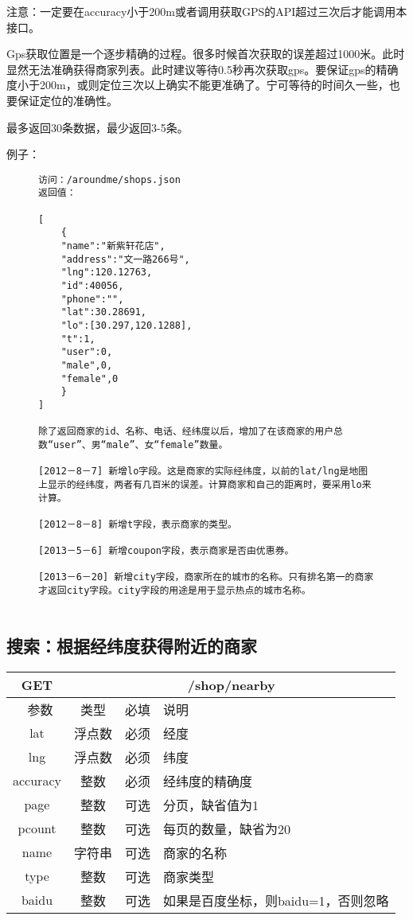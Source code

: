 \documentclass[cs4size]{ctexartutf8}
\begin{document}
注意：一定要在accuracy小于200m或者调用获取GPS的API超过三次后才能调用本接口。

Gps获取位置是一个逐步精确的过程。很多时候首次获取的误差超过1000米。此时显然无法准确获得商家列表。此时建议等待0.5秒再次获取gps。要保证gps的精确度小于200m，或则定位三次以上确实不能更准确了。宁可等待的时间久一些，也要保证定位的准确性。

最多返回30条数据，最少返回3-5条。

例子：

\begin{figure}[H]
\begin{verbatim}
访问：/aroundme/shops.json
返回值：

[
	{
	"name":"新紫轩花店",
	"address":"文一路266号",
	"lng":120.12763,
	"id":40056,
	"phone":"",
	"lat":30.28691,
	"lo":[30.297,120.1288],
	"t":1,
	"user":0,
	"male",0,
	"female",0
	}
]

除了返回商家的id、名称、电话、经纬度以后，增加了在该商家的用户总数“user”、男“male”、女“female”数量。

[2012－8－7] 新增lo字段。这是商家的实际经纬度，以前的lat/lng是地图上显示的经纬度，两者有几百米的误差。计算商家和自己的距离时，要采用lo来计算。

[2012－8－8] 新增t字段，表示商家的类型。

[2013－5－6] 新增coupon字段，表示商家是否由优惠券。

[2013－6－20] 新增city字段，商家所在的城市的名称。只有排名第一的商家才返回city字段。city字段的用途是用于显示热点的城市名称。


\end{verbatim}
\end{figure}



\subsection{搜索：根据经纬度获得附近的商家}

\begin{table}[H]
   \begin{center}
\begin{tabular}{|c|c|c|p{12cm}|}
\hline
GET & \multicolumn{3}{|c|}{/shop/nearby} \\
\hline\hline
 \  参数  & 类型 & 必填 &  说明  \\
\hline
 lat  & 浮点数 & 必须 & 经度\\
\hline
 lng  &  浮点数 & 必须 & 纬度\\ 
\hline
 accuracy  & 整数 & 必须 & 经纬度的精确度\\ 
 \hline
 page  & 整数 & 可选 & 分页，缺省值为1\\ 
 \hline
 pcount  & 整数 & 可选 & 每页的数量，缺省为20\\ 
  \hline
 name  & 字符串 & 可选 & 商家的名称\\ 
  \hline
 type  & 整数 & 可选 & 商家类型\\  
\hline
 baidu  & 整数 & 可选 & 如果是百度坐标，则baidu=1，否则忽略\\  
\hline
\end{tabular}
   \end{center}
\end{table}
\end{document}
